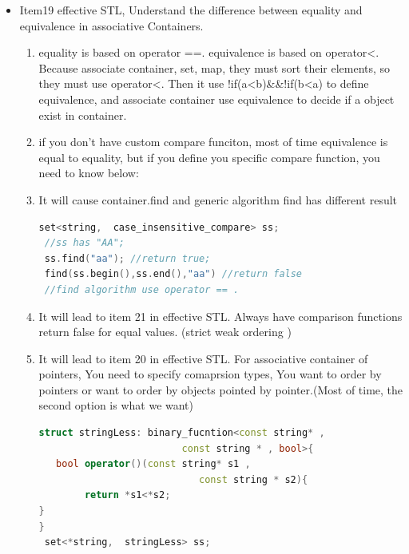 \documentclass[a4paper,11pt,twoside]{book}
\begin{document}
\begin{itemize}
\item Item19 effective STL, Understand the difference between equality and equivalence in associative Containers.
  \begin{enumerate}
  \item equality is based on operator ==. equivalence is based on operator<. Because associate container, set, map, they must sort their elements, so they must use operator<. Then it use !if(a<b)\&\&!if(b<a) to define equivalence, and associate container use equivalence to decide if a object exist in container.
  \item if you don't have custom compare funciton, most of time equivalence is equal to equality, but if you define you specific compare function, you need to know below:
  \item It will cause container.find and generic algorithm find has different result
\begin{lstlisting}[frame=single, language=c++]
 set<string,  case_insensitive_compare> ss;
 //ss has "AA";
 ss.find("aa"); //return true;
 find(ss.begin(),ss.end(),"aa") //return false
 //find algorithm use operator == .
\end{lstlisting}
  \item It will lead to item 21 in effective STL. Always have comparison functions return false for equal values. (strict weak ordering )
  \item It will lead to item 20 in effective STL. For associative container of pointers, You need to specify comaprsion types, You want to order by pointers or want to order by objects pointed by pointer.(Most of time, the second option is what we want)
\begin{lstlisting}[frame=single, language=c++]
struct stringLess: binary_fucntion<const string* ,
                         const string * , bool>{
   bool operator()(const string* s1 ,
                            const string * s2){
        return *s1<*s2;
}
}
 set<*string,  stringLess> ss;
\end{lstlisting}


  \end{enumerate}

\end{itemize}
\end{document}
